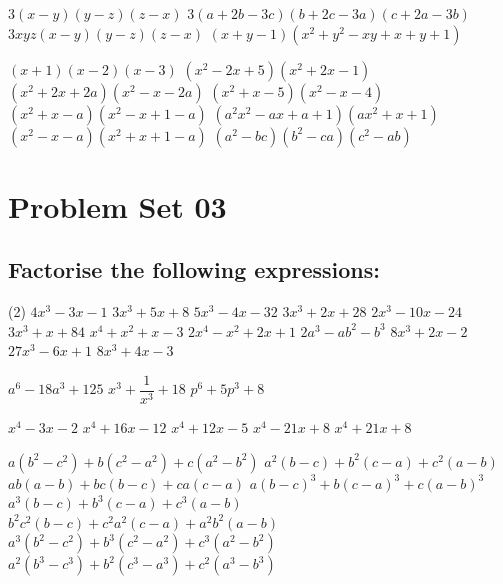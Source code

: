 \begin{tasks}[label = \arabic*.,label-width = 1.5em]
			\task $3(x-y)(y-z)(z-x)$
			\task $3(a+2b-3c)(b+2c-3a)(c+2a-3b)$
			\task $3xyz(x-y)(y-z)(z-x)$
			\task $(x+y-1)(x^2+y^2-xy+x+y+1)$


			\task $(x+1)(x-2)(x-3)$
			\task $(x^2-2x+5)(x^2+2x-1)$
			\task $(x^2+2x+2a)(x^2-x-2a)$
			\task $(x^2+x-5)(x^2-x-4)$
			\task $(x^2+x-a)(x^2-x+1-a)$
			\task $(a^2x^2-ax+a+1)(ax^2+x+1)$
			\task $(x^2-x-a)(x^2+x+1-a)$
			\task $(a^2-bc)(b^2-ca)(c^2-ab)$

		\end{tasks}

\newpage
\section{Problem Set 03}
	\subsection*{Factorise the following expressions:}
		\begin{tasks}[label = \arabic*.,label-width = 1.5em](2) %
			\task $4x^3-3x-1$
			\task $3x^3+5x+8$
			\task $5x^3-4x-32$
			\task $3x^3+2x+28$
			\task $2x^3-10x-24$
			\task $3x^3+x+84$
			\task $x^4+x^2+x-3$
			\task $2x^4-x^2+2x+1$
			\task $2a^3-ab^2-b^3$
			\task $8x^3+2x-2$
			\task $27x^3-6x+1$
			\task $8x^3+4x-3$


			\task $a^6-18a^3+125$
			\task $x^3+\dfrac{1}{x^3}+18$
			\task $p^6+5p^3+8$


			\task $x^4-3x-2$
			\task $x^4+16x-12$
			\task $x^4+12x-5$
			\task $x^4-21x+8$
			\task $x^4+21x+8$


			\task $a(b^2-c^2)+b(c^2-a^2)+c(a^2-b^2)$
			\task $a^2(b-c)+b^2(c-a)+c^2(a-b)$
			\task $ab(a-b)+bc(b-c)+ca(c-a)$
			\task $a(b-c)^3+b(c-a)^3+c(a-b)^3$
			\task $a^3(b-c)+b^3(c-a)+c^3(a-b)$
			\task $b^2c^2(b-c)+c^2a^2(c-a)+a^2b^2(a-b)$
			\task $a^3(b^2-c^2)+b^3(c^2-a^2)+c^3(a^2-b^2)$
			\task $a^2(b^3-c^3)+b^2(c^3-a^3)+c^2(a^3-b^3)$


		\end{tasks}
